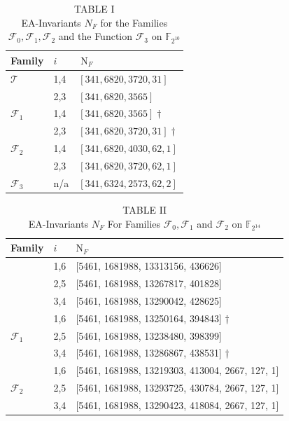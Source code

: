 \documentclass[10pt]{article}
\begin{document}
\begin{table}[h]
\begin{center}
\captionsetup{labelformat=empty}
\caption{TABLE I\\
EA-Invariants $N_{F}$ for the Families $\mathcal{F}_{0}, \mathcal{F}_{1}, \mathcal{F}_{2}$ and the Function $\mathcal{F}_{3}$ on $\mathbb{F}_{2^{10}}$}
\begin{tabular}{|l|l|l|}
\hline
Family & $i$ & $\mathrm{~N}_{F}$ \\
\hline
$\mathcal{T}$ & 1,4 & $[341,6820,3720,31]$ \\
 & 2,3 & $[341,6820,3565]$ \\
\hline
$\mathcal{F}_{1}$ & 1,4 & $[341,6820,3565] \dagger$ \\
 & 2,3 & $[341,6820,3720,31] \dagger$ \\
\hline
$\mathcal{F}_{2}$ & 1,4 & $[341,6820,4030,62,1]$ \\
 & 2,3 & $[341,6820,3720,62,1]$ \\
\hline
$\mathcal{F}_{3}$ & n/a & $[341,6324,2573,62,2]$ \\
\hline
\end{tabular}
\end{center}
\end{table}

\begin{table}[h]
\begin{center}
\captionsetup{labelformat=empty}
\caption{TABLE II\\
EA-Invariants $N_{F}$ For Families $\mathcal{F}_{0}, \mathcal{F}_{1}$ and $\mathcal{F}_{2}$ on $\mathbb{F}_{2^{14}}$}
\begin{tabular}{|l|l|l|}
\hline
Family & $i$ & $\mathrm{N}_{F}$ \\
\hline
\multirow{3}{*}{} & 1,6 & [5461, 1681988, 13313156, 436626] \\
\hline
 & 2,5 & [5461, 1681988, 13267817, 401828] \\
\hline
 & 3,4 & [5461, 1681988, 13290042, 428625] \\
\hline
\multirow[t]{3}{*}{$\mathcal{F}_{1}$} & 1,6 & [5461, 1681988, 13250164, 394843] † \\
\hline
 & 2,5 & [5461, 1681988, 13238480, 398399] \\
\hline
 & 3,4 & [5461, 1681988, 13286867, 438531] † \\
\hline
\multirow[t]{3}{*}{$\mathcal{F}_{2}$} & 1,6 & [5461, 1681988, 13219303, 413004, 2667, 127, 1] \\
\hline
 & 2,5 & [5461, 1681988, 13293725, 430784, 2667, 127, 1] \\
\hline
 & 3,4 & [5461, 1681988, 13290423, 418084, 2667, 127, 1] \\
\hline
\end{tabular}
\end{center}
\end{table}
\end{document}
